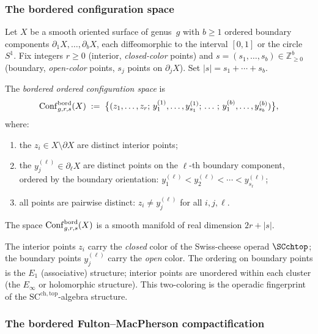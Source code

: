 \subsubsection{The bordered configuration space}

\begin{definition}
\label{def:bordered-config}
Let $X$ be a smooth oriented surface of genus~$g$ with
$b\ge 1$ ordered boundary components
$\partial_1 X,\dotsc,\partial_b X$, each diffeomorphic to the
interval $[0,1]$ or the circle $S^1$. Fix integers $r\ge 0$
(interior, \emph{closed-color} points) and
$s=(s_1,\dotsc,s_b)\in \mathbb Z_{\ge 0}^b$
(boundary, \emph{open-color} points, $s_j$ points on
$\partial_j X$). Set $|s|=s_1+\cdots+s_b$.

The \emph{bordered ordered configuration space} is
\[
\mathrm{Conf}^{\mathrm{bord}}_{g,r,s}(X)
\;:=\;
\bigl\{
(z_1,\dotsc,z_r;\,y_1^{(1)},\dotsc,y_{s_1}^{(1)};\,\dotsc;\,
y_1^{(b)},\dotsc,y_{s_b}^{(b)})
\bigr\},
\]
where:
\begin{enumerate}[label=(\alph*)]
\item the $z_i\in X\setminus\partial X$ are distinct interior
 points;
\item the $y_j^{(\ell)}\in\partial_\ell X$ are distinct points on
 the $\ell$-th boundary component, ordered by the boundary
 orientation:
 $y_1^{(\ell)}<y_2^{(\ell)}<\cdots<y_{s_\ell}^{(\ell)}$;
\item all points are pairwise distinct:
 $z_i\neq y_j^{(\ell)}$ for all $i,j,\ell$.
\end{enumerate}
The space $\mathrm{Conf}^{\mathrm{bord}}_{g,r,s}(X)$ is a smooth
manifold of real dimension $2r+|s|$.
\end{definition}

\begin{remark}
\label{rem:two-root-types}
The interior points $z_i$ carry the \emph{closed} color of the
Swiss-cheese operad $\SCchtop$; the boundary points $y_j^{(\ell)}$
carry the \emph{open} color. The ordering on boundary points
is the $E_1$ (associative) structure; interior points are
unordered within each cluster (the $E_\infty$ or holomorphic
structure). This two-coloring is the operadic fingerprint of the
$\mathrm{SC}^{\mathrm{ch},\mathrm{top}}$-algebra structure.
\end{remark}

\subsubsection{The bordered Fulton--MacPherson compactification}

